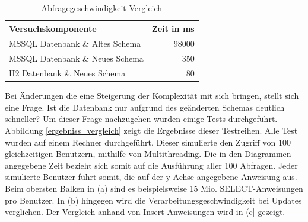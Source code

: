 \begin{table}[htbp]
\centering
\begin{tabular} {l | r}
Versuchskomponente & Zeit in ms  \\ \hline
MSSQL Datenbank \& Altes Schema & 98000 \\
MSSQL Datenbank \& Neues Schema & 350 \\
H2 Datenbank \& Neues Schema & 80 \\
\end{tabular}
\caption{Abfragegeschwindigkeit Vergleich}
\label{tb:vergleichAbfragegeschwindigkeit}
\end{table}

Bei Änderungen die eine Steigerung der Komplexität mit sich bringen, stellt sich eine Frage. Ist die Datenbank nur aufgrund des geänderten Schemas deutlich schneller? Um dieser Frage nachzugehen wurden einige Tests durchgeführt. Abbildung \ref{ergebniss_vergleich} zeigt die Ergebnisse dieser Testreihen. Alle Test wurden auf einem Rechner durchgeführt. Dieser simulierte den Zugriff von 100 gleichzeitigen Benutzern, mithilfe von Multithreading. Die in den Diagrammen angegebene Zeit bezieht sich somit auf die Ausführung aller 100 Abfragen. Jeder simulierte Benutzer führt somit, die auf der y Achse angegebene Anweisung aus. Beim obersten Balken in (a) sind es beispielsweise 15 Mio. SELECT-Anweisungen pro Benutzer. In (b) hingegen wird die Verarbeitungsgeschwindigkeit bei Updates verglichen. Der Vergleich anhand von Insert-Anweisungen wird in (c] gezeigt.    

